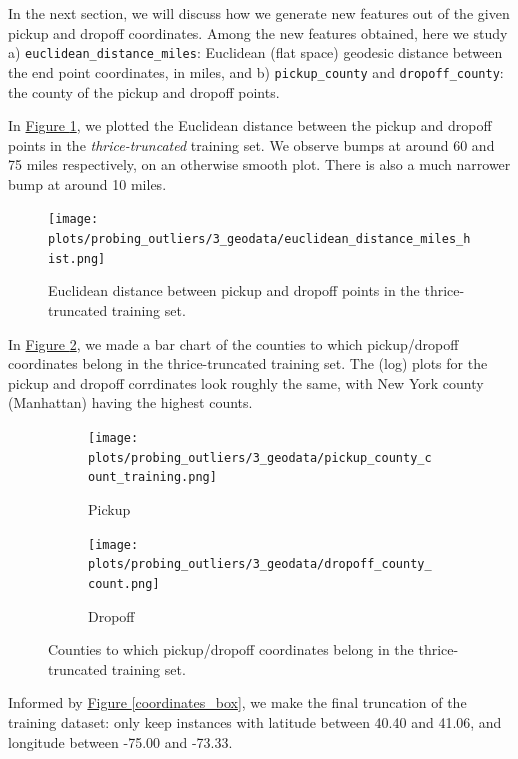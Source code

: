 \documentclass[12pt,letterpaper,final]{article}
\numberwithin{equation}{section}
\begin{document}
In the next section, we will discuss how we generate new features out of the given pickup and dropoff coordinates. Among the new features obtained, here we study a) \verb|euclidean_distance_miles|: Euclidean (flat space) geodesic distance between the end point coordinates, in miles, and b) \verb|pickup_county| and \verb|dropoff_county|: the county of the pickup and dropoff points.


In \hyperref[euclidean_distance_miles_hist1]{Figure \ref*{euclidean_distance_miles_hist1}}, we plotted the Euclidean distance between the pickup and dropoff points in the \textit{thrice-truncated} training set. We observe bumps at around 60 and 75 miles respectively, on an otherwise smooth plot. There is also a much narrower bump at around 10 miles.

\begin{figure}[H]
\begin{center}
\texttt{[image: plots/probing\_outliers/3\_geodata/euclidean\_distance\_miles\_hist.png]}
\caption{Euclidean distance between pickup and dropoff points in the thrice-truncated training set.}\label{euclidean_distance_miles_hist1}
\end{center}
\end{figure}


In \hyperref[county1]{Figure \ref*{county1}}, we made a bar chart of the counties to which pickup/dropoff coordinates belong in the thrice-truncated training set. The (log) plots for the pickup and dropoff corrdinates look roughly the same, with New York county (Manhattan) having the highest counts.

\begin{figure}[H]
\centering
\begin{subfigure}{0.6\textwidth}
  \centering
  \texttt{[image: plots/probing\_outliers/3\_geodata/pickup\_county\_count\_training.png]}
\caption{Pickup}
\end{subfigure}%
\hspace*{-2cm}
\begin{subfigure}{.6\textwidth}
  \centering
  \texttt{[image: plots/probing\_outliers/3\_geodata/dropoff\_county\_count.png]}
  \caption{Dropoff}
\end{subfigure}
\caption{Counties to which pickup/dropoff coordinates belong in the thrice-truncated training set.}
\label{county1}
\end{figure}

Informed by \hyperref[coordinates_box]{Figure \ref*{coordinates_box}}, we make the final truncation of the training dataset: only keep instances with latitude between 40.40 and 41.06, and longitude between -75.00 and -73.33.
\end{document}
